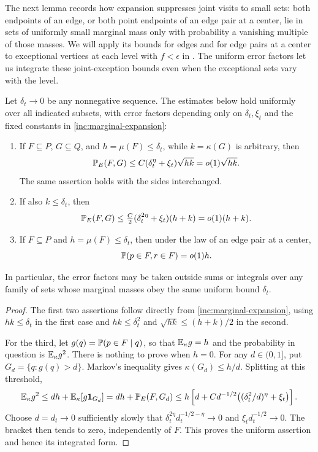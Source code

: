 The next lemma records how expansion suppresses joint visits to small
sets: both endpoints of an edge, or both point endpoints of an edge pair at a center, lie
in sets of uniformly small marginal mass only with probability a vanishing
multiple of those masses. We will apply its bounds for edges and for edge pairs at a center to
exceptional vertices at each level with $f<\epsilon$ in . The
uniform error factors let us integrate these joint-exception bounds even
when the exceptional sets vary with the level.

\begin{lemma}\label{inc:rare}
Let \(\delta_t\to0\) be any nonnegative sequence. The estimates below
hold uniformly over all indicated subsets, with error factors depending
only on \(\delta_t,\xi_t\) and the fixed constants in
\eqref{inc:marginal-expansion}:
\begin{enumerate}[label=\textup{(\roman*)}]
\item If \(F\subseteq P\), \(G\subseteq Q\), and
\(h=\mu(F)\le\delta_t\), while \(k=\kappa(G)\) is arbitrary, then
\begin{equation}\label{inc:one-small-set}
 \mathbb P_E(F,G)\le C(\delta_t^\eta+\xi_t)\sqrt{hk}
                 =o(1)\sqrt{hk}.
\end{equation}
The same assertion holds with the sides interchanged.
\item If also \(k\le\delta_t\), then
\begin{equation}\label{inc:joint-rare-edge}
 \mathbb P_E(F,G)\le\tfrac C2(\delta_t^{2\eta}+\xi_t)(h+k)
                 =o(1)(h+k).
\end{equation}
\item If \(F\subseteq P\) and \(h=\mu(F)\le\delta_t\), then
under the law of an edge pair at a center,
\begin{equation}\label{inc:joint-rare-wedge}
 \mathbb P(p\in F,r\in F)=o(1)h.
\end{equation}
\end{enumerate}
In particular, the error factors may be taken outside sums or integrals
over any family of sets whose marginal masses obey the same uniform
bound \(\delta_t\).
\end{lemma}

\begin{proof}
The first two assertions follow directly from
\eqref{inc:marginal-expansion}, using \(hk\le\delta_t\) in the
first case and \(hk\le\delta_t^2\) and
\(\sqrt{hk}\le(h+k)/2\) in the second.

For the third, let \(g(q)=\mathbb P(p\in F\mid q)\), so that
\(\mathbb E_\kappa g=h\) and the probability in question is
\(\mathbb E_\kappa g^2\). There is nothing to prove when \(h=0\).
For any \(d\in(0,1]\), put \(G_d=\{q:g(q)>d\}\). Markov's
inequality gives \(\kappa(G_d)\le h/d\). Splitting at this threshold,
\[
 \mathbb E_\kappa g^2
 \le dh+\mathbb E_\kappa[g\mathbf 1_{G_d}]
 =dh+\mathbb P_E(F,G_d)
 \le h\left[d+C d^{-1/2}
                  \bigl((\delta_t^2/d)^\eta+\xi_t\bigr)\right].
\]
Choose \(d=d_t\to0\) sufficiently slowly that
\(\delta_t^{2\eta}d_t^{-1/2-\eta}\to0\) and
\(\xi_t d_t^{-1/2}\to0\). The bracket then tends to zero,
independently of \(F\). This proves the uniform assertion and hence
its integrated form.
\end{proof}

